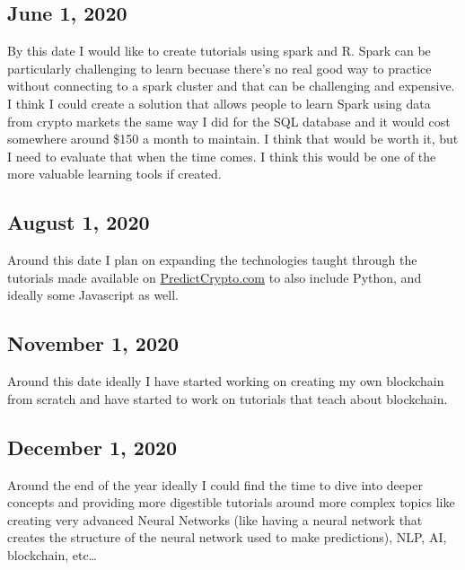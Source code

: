 \documentclass[
]{book}
\begin{document}
\hypertarget{june-1-2020}{%
\subsection{June 1, 2020}\label{june-1-2020}}

By this date I would like to create tutorials using spark and R. Spark can be particularly challenging to learn becuase there's no real good way to practice without connecting to a spark cluster and that can be challenging and expensive. I think I could create a solution that allows people to learn Spark using data from crypto markets the same way I did for the SQL database and it would cost somewhere around \$150 a month to maintain. I think that would be worth it, but I need to evaluate that when the time comes. I think this would be one of the more valuable learning tools if created.

\hypertarget{august-1-2020}{%
\subsection{August 1, 2020}\label{august-1-2020}}

Around this date I plan on expanding the technologies taught through the tutorials made available on \href{https://www.predictcrypto.com/tutorials}{PredictCrypto.com} to also include Python, and ideally some Javascript as well.

\hypertarget{november-1-2020}{%
\subsection{November 1, 2020}\label{november-1-2020}}

Around this date ideally I have started working on creating my own blockchain from scratch and have started to work on tutorials that teach about blockchain.

\hypertarget{december-1-2020}{%
\subsection{December 1, 2020}\label{december-1-2020}}

Around the end of the year ideally I could find the time to dive into deeper concepts and providing more digestible tutorials around more complex topics like creating very advanced Neural Networks (like having a neural network that creates the structure of the neural network used to make predictions), NLP, AI, blockchain, etc\ldots{}

  
\end{document}
